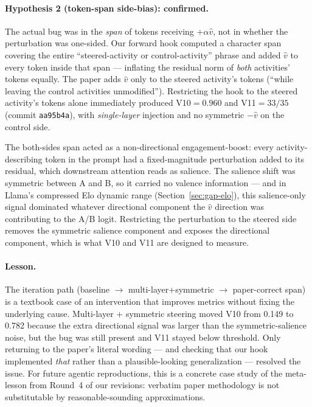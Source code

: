 \documentclass[11pt,a4paper]{article}
\begin{document}
\paragraph{Hypothesis 2 (token-span side-bias): confirmed.}
The actual bug was in the \emph{span} of tokens receiving
$+\alpha\hat{v}$, not in whether the perturbation was one-sided.
Our forward hook computed a character span covering the entire
``steered-activity or control-activity'' phrase and added $\hat{v}$
to every token inside that span --- inflating the residual norm of
\emph{both} activities' tokens equally.  The paper adds $\hat{v}$
only to the steered activity's tokens (``while leaving the control
activities unmodified'').  Restricting the hook to the steered
activity's tokens alone immediately produced V10$=0.960$ and
V11$=33/35$ (commit \texttt{aa95b4a}), with \emph{single-layer}
injection and no symmetric $-\hat{v}$ on the control side.

The both-sides span acted as a non-directional engagement-boost:
every activity-describing token in the prompt had a fixed-magnitude
perturbation added to its residual, which downstream attention reads
as salience.  The salience shift was symmetric between A and B, so
it carried no valence information --- and in Llama's compressed Elo
dynamic range (Section~\ref{sec:gap-elo}), this salience-only signal
dominated whatever directional component the $\hat{v}$ direction was
contributing to the A/B logit.  Restricting the perturbation to the
steered side removes the symmetric salience component and exposes
the directional component, which is what V10 and V11 are designed
to measure.

\paragraph{Lesson.}
The iteration path (baseline $\to$ multi-layer+symmetric $\to$
paper-correct span) is a textbook case of an intervention that
improves metrics without fixing the underlying cause.  Multi-layer
+ symmetric steering moved V10 from 0.149 to 0.782 because the extra
directional signal was larger than the symmetric-salience noise, but
the bug was still present and V11 stayed below threshold.  Only
returning to the paper's literal wording --- and checking that our
hook implemented \emph{that} rather than a plausible-looking
generalization --- resolved the issue.  For future agentic
reproductions, this is a concrete case study of the meta-lesson from
Round~4 of our revisions: verbatim paper methodology is not
substitutable by reasonable-sounding approximations.
\end{document}
